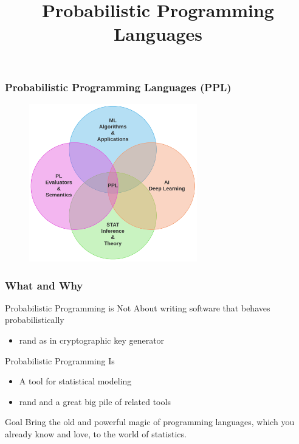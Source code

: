\documentclass[usenames,dvipsnames]{beamer}
\title[PPL]{Probabilistic Programming Languages}
\author[Dogan]
{%
\texorpdfstring{
  \begin{columns}
    \column{.85\linewidth}
    \centering
    Haluk Dogan\\
    \url{https://haluk.github.io/}\\
    \href{mailto:hdogan@vivaldi.net}{hdogan@vivaldi.net} \\
  \end{columns}
}
{Dogan}
}
\institute[SBBI {\fontsize{5}{6}\selectfont @} CSE {\fontsize{5}{6}\selectfont
  @} UNL] %
{
  Department of Computer Science\\
  University of Nebraska-Lincoln
}
\date[\today] %
{\today\\
  \vspace{0.5cm}
  \begin{tiny}Some slides copied from \\
    Dr. Frank Wood,  University of Oxford
  \end{tiny}
}
\begin{document}
\begin{frame}
  \titlepage{}
\end{frame}

\begin{frame}
  \frametitle{Probabilistic Programming Languages (PPL)}
  \begin{figure}[ht]
    \centering
    \includegraphics[width=0.65\textwidth,keepaspectratio]{figures/pplvenn.pdf}
    \caption*{\label{fig:ppl-venn}}
  \end{figure}
\end{frame}
\begin{frame}
  \frametitle{What and Why}
  \begin{alertblock}{Probabilistic Programming is Not}
    About writing software that behaves probabilistically
    \begin{itemize}
      \item \textrm{rand} as in cryptographic key generator
    \end{itemize}
  \end{alertblock}
  \begin{exampleblock}{Probabilistic Programming Is}
    \begin{itemize}
      \item A tool for statistical modeling
      \item \textrm{rand} and a great big pile of related tools
    \end{itemize}
  \end{exampleblock}
  \begin{block}{Goal}
    Bring the old and powerful magic of programming
    languages, which you already know and love, to the world of statistics.
  \end{block}
\end{frame}
\end{document}
